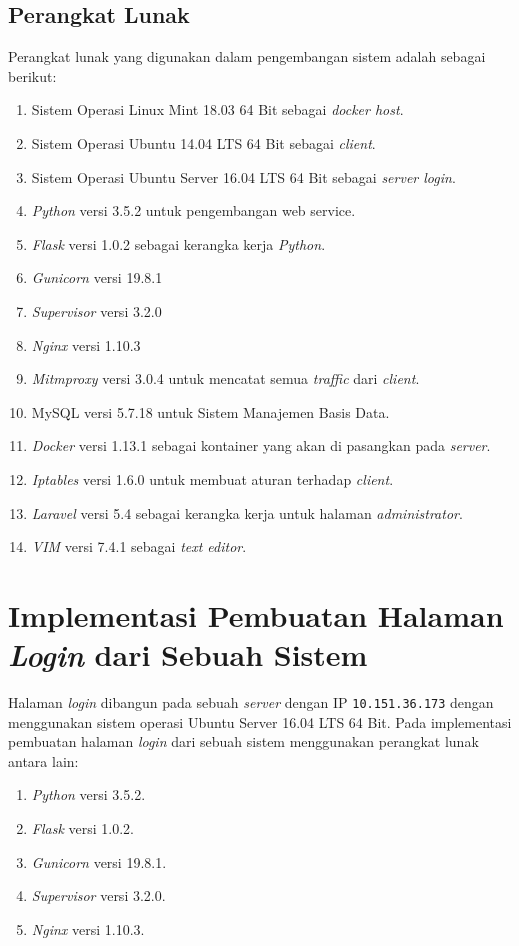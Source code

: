     \subsection{Perangkat Lunak}
    Perangkat lunak yang digunakan dalam pengembangan sistem adalah sebagai berikut:
    \begin{enumerate}
    \item Sistem Operasi Linux Mint 18.03 64 Bit sebagai \textit{docker host}.
    \item Sistem Operasi Ubuntu 14.04 LTS 64 Bit sebagai \textit{client}.
    \item Sistem Operasi Ubuntu Server 16.04 LTS 64 Bit sebagai \textit{server login}.
    \item \textit{Python} versi 3.5.2 untuk pengembangan web service. 
    \item \textit{Flask} versi 1.0.2 sebagai kerangka kerja \textit{Python}.
    \item \textit{Gunicorn} versi 19.8.1
    \item \textit{Supervisor} versi 3.2.0
    \item \textit{Nginx} versi 1.10.3
    \item \textit{Mitmproxy} versi 3.0.4 untuk mencatat semua \textit{traffic} dari \textit{client}.
    \item MySQL versi 5.7.18 untuk Sistem Manajemen Basis Data.
    \item \textit{Docker} versi 1.13.1 sebagai kontainer yang akan di pasangkan pada \textit{server}.
    \item \textit{Iptables} versi 1.6.0 untuk membuat aturan terhadap \textit{client}.
    \item \textit{Laravel} versi 5.4 sebagai kerangka kerja untuk halaman \textit{administrator}. 
    \item \textit{VIM} versi 7.4.1 sebagai \textit{text editor}.
    \end{enumerate}
    
  \section{Implementasi Pembuatan Halaman \textit{Login} dari Sebuah Sistem}
  Halaman \textit{login} dibangun pada sebuah \textit{server} dengan IP \texttt{10.151.36.173} dengan menggunakan sistem operasi Ubuntu Server 16.04 LTS 64 Bit. Pada implementasi pembuatan halaman \textit{login} dari sebuah sistem menggunakan perangkat lunak antara lain:
  \begin{enumerate}
  \item \textit{Python} versi 3.5.2.
  \item \textit{Flask} versi 1.0.2.
  \item \textit{Gunicorn} versi 19.8.1.
  \item \textit{Supervisor} versi 3.2.0.
  \item \textit{Nginx} versi 1.10.3.
  \end{enumerate}

